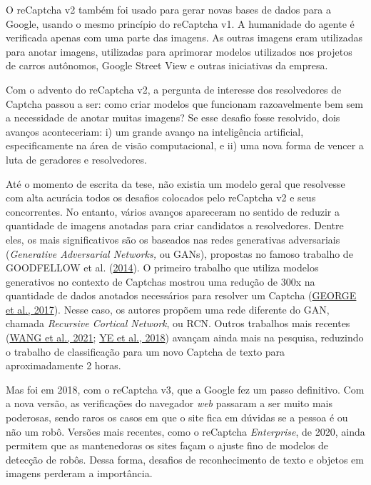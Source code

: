 \documentclass[12pt,twoside,brazilian]{book}
\begin{document}
O reCaptcha v2 também foi usado para gerar novas bases de dados para a
Google, usando o mesmo princípio do reCaptcha v1. A humanidade do agente
é verificada apenas com uma parte das imagens. As outras imagens eram
utilizadas para anotar imagens, utilizadas para aprimorar modelos
utilizados nos projetos de carros autônomos, Google Street View e outras
iniciativas da empresa.

Com o advento do reCaptcha v2, a pergunta de interesse dos resolvedores
de Captcha passou a ser: como criar modelos que funcionam razoavelmente
bem sem a necessidade de anotar muitas imagens? Se esse desafio fosse
resolvido, dois avanços aconteceriam: i) um grande avanço na
inteligência artificial, especificamente na área de visão computacional,
e ii) uma nova forma de vencer a luta de geradores e resolvedores.

Até o momento de escrita da tese, não existia um modelo geral que
resolvesse com alta acurácia todos os desafios colocados pelo reCaptcha
v2 e seus concorrentes. No entanto, vários avanços apareceram no sentido
de reduzir a quantidade de imagens anotadas para criar candidatos a
resolvedores. Dentre eles, os mais significativos são os baseados nas
redes generativas adversariais (\emph{Generative Adversarial Networks,}
ou GANs), propostas no famoso trabalho de GOODFELLOW et al.
(\protect\hyperlink{ref-goodfellowGenerativeAdversarialNetworks2014}{2014}).
O primeiro trabalho que utiliza modelos generativos no contexto de
Captchas mostrou uma redução de 300x na quantidade de dados anotados
necessários para resolver um Captcha
(\protect\hyperlink{ref-george2017}{GEORGE et al., 2017}). Nesse caso,
os autores propõem uma rede diferente do GAN, chamada \emph{Recursive
Cortical Network}, ou RCN. Outros trabalhos mais recentes
(\protect\hyperlink{ref-wang2021}{WANG et al., 2021};
\protect\hyperlink{ref-ye2018}{YE et al., 2018}) avançam ainda mais na
pesquisa, reduzindo o trabalho de classificação para um novo Captcha de
texto para aproximadamente 2 horas.

Mas foi em 2018, com o reCaptcha v3, que a Google fez um passo
definitivo. Com a nova versão, as verificações do navegador \emph{web}
passaram a ser muito mais poderosas, sendo raros os casos em que o site
fica em dúvidas se a pessoa é ou não um robô. Versões mais recentes,
como o reCaptcha \emph{Enterprise}, de 2020, ainda permitem que as
mantenedoras os sites façam o ajuste fino de modelos de detecção de
robôs. Dessa forma, desafios de reconhecimento de texto e objetos em
imagens perderam a importância.
\end{document}
